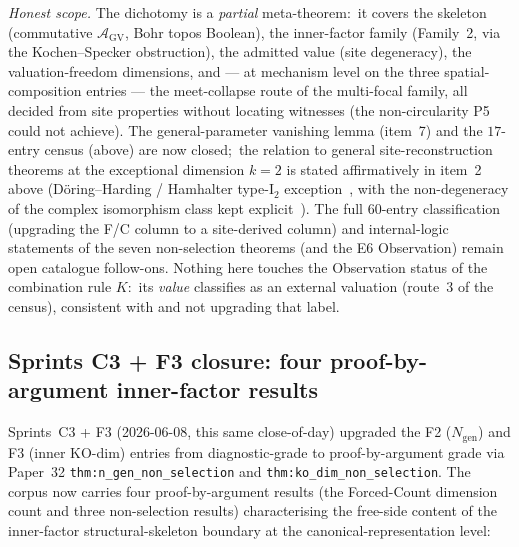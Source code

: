 \documentclass[11pt,a4paper]{article}
\theoremstyle{plain}
\theoremstyle{definition}
\begin{document}
\emph{Honest scope.}  The dichotomy is a \emph{partial} meta-theorem:\
it covers the skeleton (commutative $\mathcal{A}_{\mathrm{GV}}$, Bohr
topos Boolean), the inner-factor family (Family~2, via the
Kochen--Specker obstruction), the admitted value (site degeneracy),
the valuation-freedom dimensions, and --- at mechanism level on the
three spatial-composition entries --- the meet-collapse route of the
multi-focal family, all decided from site properties without locating
witnesses (the non-circularity P5 could not achieve).  The
general-parameter vanishing lemma (item~7) and the $17$-entry census
(above) are now closed;\ the relation to general site-reconstruction
theorems at the exceptional dimension $k = 2$ is stated affirmatively
in item~2 above (D\"oring--Harding / Hamhalter type-I$_2$
exception~\cite{doring_harding2016, hamhalter2011}, with the
non-degeneracy of the complex isomorphism class kept
explicit~\cite{lindenhovius2015}).  The full $60$-entry classification
(upgrading the F/C column to a site-derived column) and internal-logic
statements of the seven non-selection theorems (and the E6
Observation) remain open catalogue
follow-ons.  Nothing here touches the Observation status of the
combination rule $K$:\ its \emph{value} classifies as an external
valuation (route~3 of the census), consistent with and not upgrading
that label.

\subsection{Sprints C3 + F3 closure:  four proof-by-argument inner-factor results}
\label{sec:c3_closure}

Sprints~C3 + F3 (2026-06-08, this same close-of-day) upgraded the F2 ($N_{\mathrm{gen}}$) and F3 (inner KO-dim) entries from diagnostic-grade to proof-by-argument grade via Paper~32 \texttt{thm:n\_gen\_non\_selection} and \texttt{thm:ko\_dim\_non\_selection}. The corpus now carries four proof-by-argument results (the Forced-Count dimension count and three non-selection results) characterising the free-side content of the inner-factor structural-skeleton boundary at the canonical-representation level:
\end{document}
